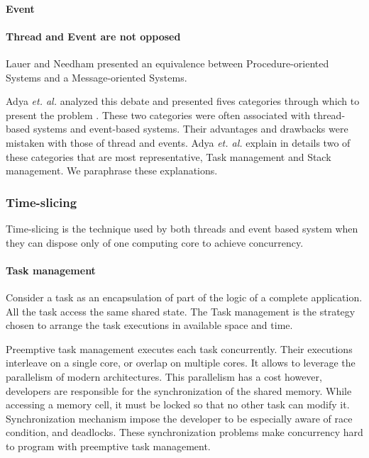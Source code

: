 \paragraph{Event}




\paragraph{Thread and Event are not opposed}



Lauer and Needham \cite{Lauer1979} presented an equivalence between Procedure-oriented Systems and a Message-oriented Systems.

Adya \textit{et. al.} analyzed this debate and presented fives categories through which to present the problem \cite{Adya2002}.
These two categories were often associated with thread-based systems and event-based systems.
Their advantages and drawbacks were mistaken with those of thread and events.
Adya \textit{et. al.} explain in details two of these categories that are most representative, Task management and Stack management.
We paraphrase these explanations.


\subsubsection{Time-slicing}


Time-slicing is the technique used by both threads and event based system when they can dispose only of one computing core to achieve concurrency.

\paragraph{Task management}

Consider a task as an encapsulation of part of the logic of a complete application.
All the task access the same shared state.
The Task management is the strategy chosen to arrange the task executions in available space and time.

Preemptive task management executes each task concurrently.
Their executions interleave on a single core, or overlap on multiple cores.
It allows to leverage the parallelism of modern architectures.
This parallelism has a cost however, developers are responsible for the synchronization of the shared memory.
While accessing a memory cell, it must be locked so that no other task can modify it.
Synchronization mechanism impose the developer to be especially aware of race condition, and deadlocks.
These synchronization problems make concurrency hard to program with preemptive task management.

